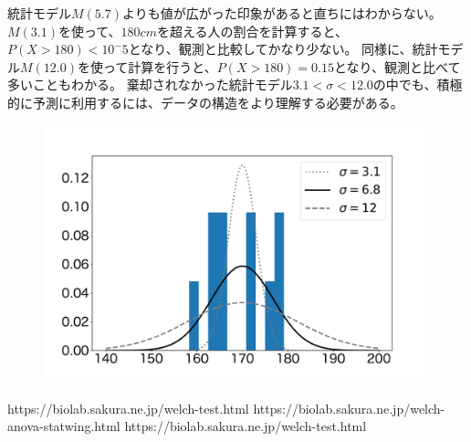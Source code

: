 統計モデル$M(5.7)$よりも値が広がった印象があると直ちにはわからない。
$M(3.1)$を使って、$180cm$を超える人の割合を計算すると、$P(X>180)<10^-5$となり、観測と比較してかなり少ない。
同様に、統計モデル$M(12.0)$を使って計算を行うと、$P(X>180)=0.15$となり、観測と比べて多いこともわかる。
棄却されなかった統計モデル$3.1<\sigma<12.0$の中でも、積極的に予測に利用するには、データの構造をより理解する必要がある。


\begin{figure}
\begin{center}
    \includegraphics[width=15cm]{./image/06_/normal_sigma.pdf}
\end{center}
\end{figure}

https://biolab.sakura.ne.jp/welch-test.html
https://biolab.sakura.ne.jp/welch-anova-statwing.html
https://biolab.sakura.ne.jp/welch-test.html
\fi

